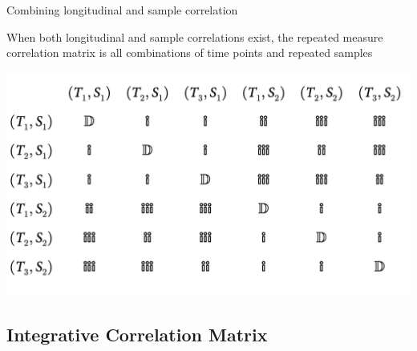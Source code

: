 \documentclass{beamer}
\begin{document}
\begin{frame}[t]{Combining longitudinal and sample correlation}

When both longitudinal and sample correlations exist, the repeated measure correlation matrix is all combinations of time points and repeated samples

  \includegraphics[width = \textwidth]{longitudinal_sample.png}

\end{frame}




\subsection{Integrative Correlation Matrix}
\end{document}
